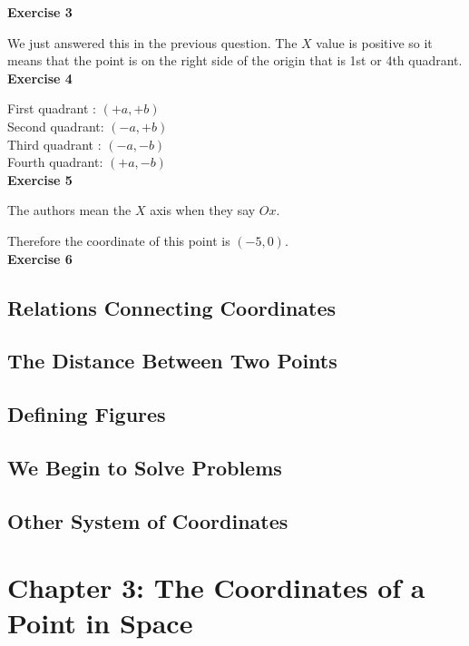 \documentclass[10pt]{article}
\begin{document}
\textbf{Exercise 3}

We just answered this in the previous question.
The $X$ value is positive so it means that the point is on the right side of the origin that is 1st or 4th quadrant.\\


\textbf{Exercise 4}

First quadrant : $(+a, +b)$\\
Second quadrant: $(-a, +b)$\\
Third quadrant : $(-a, -b)$\\
Fourth quadrant: $(+a, -b)$\\


\textbf{Exercise 5}

The authors mean the $X$ axis when they say $Ox$.

Therefore the coordinate of this point is $(-5, 0)$.\\


\textbf{Exercise 6}

\subsection{Relations Connecting Coordinates}

\subsection{The Distance Between Two Points}

\subsection{Defining Figures}

\subsection{We Begin to Solve Problems}

\subsection{Other System of Coordinates}



\section{Chapter 3: The Coordinates of a Point in Space}
\end{document}
